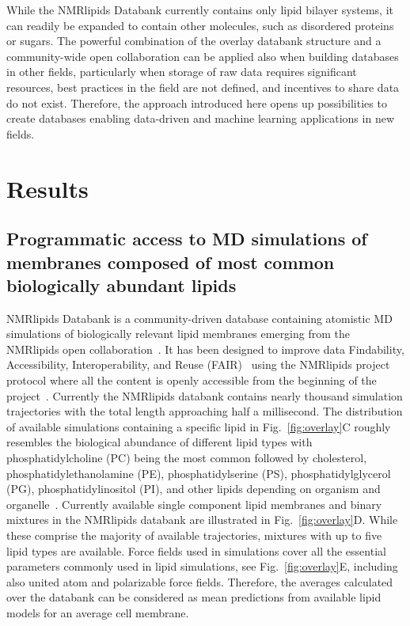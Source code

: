 \documentclass[fleqn,10pt]{wlscirep}
\begin{document}
While the NMRlipids Databank currently contains only lipid bilayer systems, it can readily be expanded to contain other molecules, such as disordered proteins or sugars. The powerful combination of the overlay databank structure and a community-wide open collaboration can be applied also when building databases in other fields, particularly when storage of raw data requires significant resources, best practices in the field are not defined, and incentives to share data do not exist. Therefore, the approach introduced here opens up possibilities to create databases enabling data-driven and machine learning applications in new fields.



\section{Results}

\subsection{Programmatic access to MD simulations of membranes composed of most common biologically abundant lipids}

NMRlipids Databank is a community-driven database containing atomistic MD simulations of biologically relevant lipid membranes emerging from the NMRlipids open collaboration~\cite{botan15,ollila16,catte16,antila19,bacle21}. It has been designed to improve data Findability, Accessibility, Interoperability, and Reuse (FAIR)~\cite{wilkinson16} using the NMRlipids project protocol where all the content is openly accessible from the beginning of the project~\cite{botan15}.  Currently the NMRlipids databank contains nearly thousand simulation trajectories with the total length approaching half a millisecond. The distribution of available simulations containing a specific lipid in Fig.~\ref{fig:overlay}C roughly resembles the biological abundance of different lipid types with phosphatidylcholine (PC) being the most common followed by cholesterol, phosphatidylethanolamine (PE), phosphatidylserine (PS), phosphatidylglycerol (PG), phosphatidylinositol (PI), and other lipids depending on organism and organelle~\cite{vanmeer08}. Currently available single component lipid membranes and binary mixtures in the NMRlipids databank are illustrated in Fig.~\ref{fig:overlay}D. While these comprise the majority of available trajectories, mixtures with up to five lipid types are available. Force fields used in simulations cover all the essential parameters commonly used in lipid simulations, see Fig.~\ref{fig:overlay}E, including also united atom and polarizable force fields. Therefore, the averages calculated over the databank can be considered as mean predictions from available lipid models for an average cell membrane.
\end{document}

